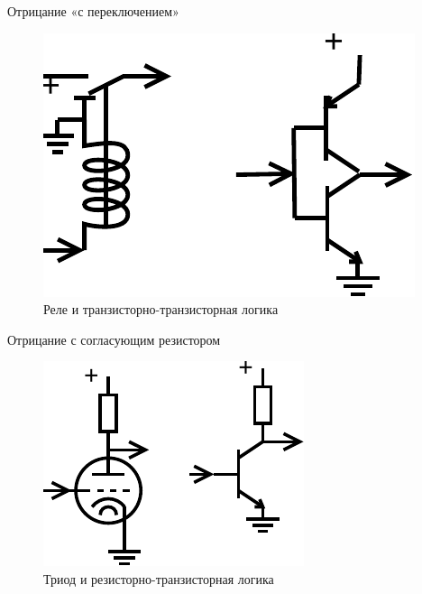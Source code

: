 \documentclass[xetex,aspectratio=43]{beamer}
\begin{document}
\begin{frame}{Отрицание «с переключением»}
    \begin{figure}
        \includegraphics[height=0.5\textheight]{img/07.not_switch.pdf}
        \caption{Реле и транзисторно-транзисторная логика}
    \end{figure}
\end{frame}

\begin{frame}{Отрицание с согласующим резистором}
    \begin{figure}
        \includegraphics[height=0.5\textheight]{img/07.not_resist.pdf}
        \caption{Триод и резисторно-транзисторная логика}
    \end{figure}
\end{frame}
\end{document}
